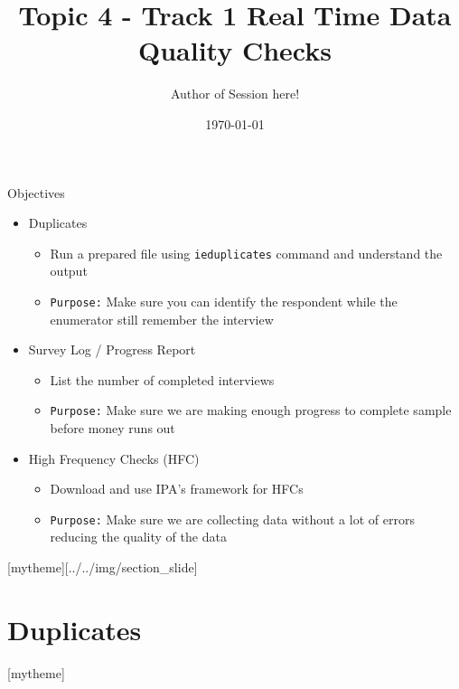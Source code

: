 \documentclass[aspectratio=169]{beamer}
\title{Topic 4 - Track 1 \newline Real Time Data Quality Checks}
\date{\today}
\author{Author of Session here!} %
\institute{Development Impact Evaluation (DIME) \newline The World Bank }
\newcommand{\sectionpic}[2]{
	\setbeamertemplate{section page}[mytheme][#2]
	\section{#1}
	\setbeamertemplate{section page}[mytheme]
}
\begin{document}
	{
		\maketitle
	}

\begin{frame}{Objectives}
	\begin{itemize}
		\item Duplicates
		\begin{itemize}
			\item Run a prepared file using \texttt{ieduplicates} command and understand the output
			\item \texttt{Purpose:} Make sure you can identify the respondent while the enumerator still remember the interview
		\end{itemize}
		\item Survey Log / Progress Report
		\begin{itemize}
			\item List the number of completed interviews
			\item \texttt{Purpose:} Make sure we are making enough progress to complete sample before money runs out
		\end{itemize}
		\item High Frequency Checks (HFC)
		\begin{itemize}
			\item Download and use IPA's framework for HFCs
			\item \texttt{Purpose:} Make sure we are collecting data without a lot of errors reducing the quality of the data
		\end{itemize}
	\end{itemize}
\end{frame}

\sectionpic{Duplicates}{../../img/section_slide}
\end{document}
